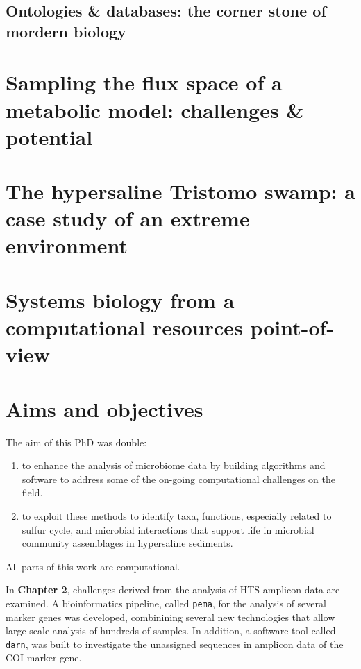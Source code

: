 \subsection{Ontologies \& databases: the corner stone of mordern biology}







\section{Sampling the flux space of a metabolic model: challenges \& potential}



\section{The hypersaline Tristomo swamp: a case study of an extreme environment}


\section{Systems biology from a computational resources point-of-view}





\section{Aims and objectives}

The aim of this PhD was double:
\begin{enumerate}
   \item to enhance the analysis of microbiome data by building algorithms and software to address some of the on-going computational challenges on the field.
   \item to exploit these methods to identify taxa, functions, especially related to sulfur cycle, and microbial interactions that support life in microbial community assemblages in hypersaline sediments.
\end{enumerate}
All parts of this work are computational. 

In \textbf{Chapter 2}, challenges derived from the analysis of HTS amplicon data are examined.
A bioinformatics pipeline, called \texttt{pema}, for the analysis of several marker genes was developed, combinining several new technologies that allow large scale analysis of hundreds of samples. 
In addition, a software tool called \texttt{darn}, was built to investigate the unassigned sequences in amplicon data of the COI marker gene. 

